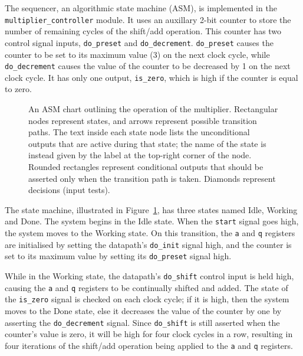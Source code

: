\documentclass[a4paper]{article}
\begin{document}
The sequencer, an algorithmic state machine (ASM), is implemented in the \texttt{multiplier\_controller} module. It uses an auxillary 2-bit counter to store the number of remaining cycles of the shift/add operation. This counter has two control signal inputs, \texttt{do\_preset} and \texttt{do\_decrement}. \texttt{do\_preset} causes the counter to be set to its maximum value (3) on the next clock cycle, while \texttt{do\_decrement} causes the value of the counter to be decreased by 1 on the next clock cycle. It has only one output, \texttt{is\_zero}, which is high if the counter is equal to zero.

\begin{figure}[bp]
  \centering
  
  \caption{An ASM chart outlining the operation of the multiplier. Rectangular nodes represent states, and arrows represent possible transition paths. The text inside each state node lists the unconditional outputs that are active during that state; the name of the state is instead given by the label at the top-right corner of the node. Rounded rectangles represent conditional outputs that should be asserted only when the transition path is taken. Diamonds represent decisions (input tests).}
  \label{fig:asm}
\end{figure}

The state machine, illustrated in Figure~\ref{fig:asm}, has three states named Idle, Working and Done. The system begins in the Idle state. When the \texttt{start} signal goes high, the system moves to the Working state. On this transition, the \texttt{a} and \texttt{q} registers are initialised by setting the datapath's \texttt{do\_init} signal high, and the counter is set to its maximum value by setting its \texttt{do\_preset} signal high.

While in the Working state, the datapath's \texttt{do\_shift} control input is held high, causing the \texttt{a} and \texttt{q} registers to be continually shifted and added. The state of the \texttt{is\_zero} signal is checked on each clock cycle; if it is high, then the system moves to the Done state, else it decreases the value of the counter by one by asserting the \texttt{do\_decrement} signal. Since \texttt{do\_shift} is still asserted when the counter's value is zero, it will be high for four clock cycles in a row, resulting in four iterations of the shift/add operation being applied to the \texttt{a} and \texttt{q} registers.
\end{document}
